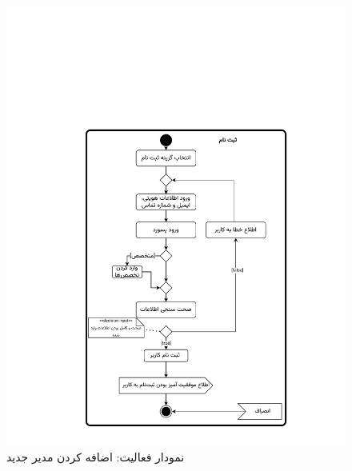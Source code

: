 \begin{figure}[ht!]
	\centering
	\includegraphics[scale=0.8, page=7]{figs/OOD-activity1-10.pdf}
	\caption{نمودار فعالیت: اضافه کردن مدیر جدید}
\end{figure}
\FloatBarrier
\newpage

